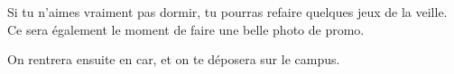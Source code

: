 Si tu n'aimes vraiment pas dormir, tu pourras refaire quelques jeux de la veille. Ce sera également le moment de faire une belle photo de promo.

On rentrera ensuite en car, et on te déposera sur le campus.
